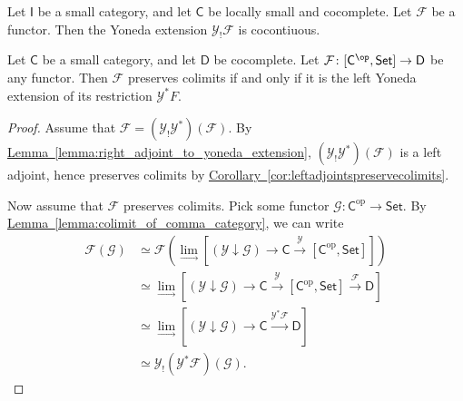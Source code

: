 \documentclass[main.tex]{subfiles}
\begin{document}
\begin{corollary}
  \label{cor:yoneda_extension_results_in_cocontinuous_functor}
  Let $\mathsf{I}$ be a small category, and let $\mathsf{C}$ be locally small and cocomplete. Let $\mathcal{F}$ be a functor. Then the Yoneda extension $\mathcal{Y}_{!}\mathcal{F}$ is cocontiuous.
\end{corollary}

\begin{theorem}
  \label{thm:yoneda_extension_of_restriction_preserves_colimits}
  Let $\mathsf{C}$ be a small category, and let $\mathsf{D}$ be cocomplete. Let $\mathcal{F}\colon [\mathsf{C}^{\op}, \mathsf{Set}] \to \mathsf{D}$ be any functor. Then $\mathcal{F}$ preserves colimits if and only if it is the left Yoneda extension of its restriction $\mathcal{Y}^{*}F$.
\end{theorem}
\begin{proof}
  Assume that $\mathcal{F} = (\mathcal{Y}_{!}\mathcal{Y}^{*})(\mathcal{F})$. By \hyperref[lemma:right_adjoint_to_yoneda_extension]{Lemma~\ref*{lemma:right_adjoint_to_yoneda_extension}}, $(\mathcal{Y}_{!}\mathcal{Y}^{*})(\mathcal{F})$ is a left adjoint, hence preserves colimits by \hyperref[cor:leftadjointspreservecolimits]{Corollary~\ref*{cor:leftadjointspreservecolimits}}.
  
  Now assume that $\mathcal{F}$ preserves colimits. Pick some functor $\mathcal{G}\colon \mathsf{C}^{\mathrm{op}} \to \mathsf{Set}$. By \hyperref[lemma:colimit_of_comma_category]{Lemma~\ref*{lemma:colimit_of_comma_category}}, we can write
  \begin{align*}
    \mathcal{F}(\mathcal{G}) &\simeq \mathcal{F}\left( \lim_{\rightarrow}\left[ (\mathcal{Y} \downarrow \mathcal{G}) \to \mathsf{C} \overset{\mathcal{Y}}{\to} [\mathsf{C}^{\mathrm{op}}, \mathsf{Set}] \right] \right) \\
    &\simeq \lim_{\rightarrow} \left[ (\mathcal{Y} \downarrow \mathcal{G}) \to \mathsf{C} \overset{\mathcal{Y}}{\to} [\mathsf{C}^{\mathrm{op}}, \mathsf{Set}] \overset{\mathcal{F}}{\to} \mathsf{D} \right] \\
    &\simeq \lim_{\rightarrow} \left[ (\mathcal{Y} \downarrow \mathcal{G}) \to \mathsf{C} \overset{\mathcal{Y}^{*}\mathcal{F}}{\to} \mathsf{D} \right] \\
    &\simeq \mathcal{Y}_{!}(\mathcal{Y}^{*}\mathcal{F})(\mathcal{G}).
  \end{align*}
\end{proof}
\end{document}
